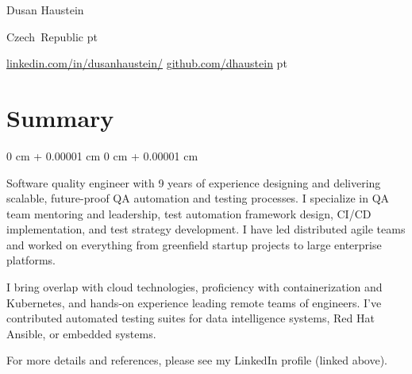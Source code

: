 \documentclass[10pt, a4paper]{article}
\newenvironment{onecolentry}{
    \begin{adjustwidth}{
        0 cm + 0.00001 cm
    }{
        0 cm + 0.00001 cm
    }
}{
    \end{adjustwidth}
} %
\newenvironment{header}{
    \setlength{\topsep}{0pt}\par\kern\topsep\centering\linespread{1.5}
}{
    \par\kern\topsep
} %
\let\hrefWithoutArrow\href
\newcommand{\AND}{$|$}
\begin{document}
    \begin{header}
        \fontsize{25 pt}{25 pt}\selectfont Dusan Haustein

        \vspace{5 pt}

        \normalsize
        \mbox{Czech Republic}%
         pt%

        \mbox{\hrefWithoutArrow{https://www.linkedin.com/in/dusanhaustein/}{linkedin.com/in/dusanhaustein/}}
        \hspace{35.0 pt}%
        \mbox{\hrefWithoutArrow{https://github.com/dhaustein}{github.com/dhaustein}}%
         pt%

    \end{header}

    \vspace{5 pt - 0.3 cm}


    \section{Summary}

        \begin{onecolentry}
            \justifying{}\parindent=0pt
            Software quality engineer with 9 years of experience designing and delivering scalable, future-proof QA automation and testing processes.
            I specialize in QA team mentoring and leadership, test automation framework design, CI/CD implementation, and test strategy development.
            I have led distributed agile teams and worked on everything from greenfield startup projects to large enterprise platforms.
            \par\vspace{\baselineskip}
            I bring overlap with cloud technologies, proficiency with containerization and Kubernetes, and hands-on experience leading remote teams of engineers.
            I've contributed automated testing suites for data intelligence systems, Red Hat Ansible, or embedded systems.
            \par\vspace{\baselineskip}
            For more details and references, please see my LinkedIn profile (linked above).
        \end{onecolentry}

        \vspace{0.2 cm}


\end{document}
